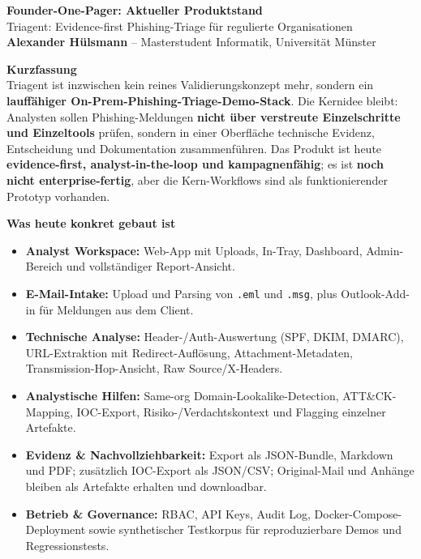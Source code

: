 \documentclass[10pt,a4paper]{article}
\begin{document}
\begin{center}
{\Large \textbf{Founder-One-Pager: Aktueller Produktstand}}\\[0.15em]
{\large Triagent: Evidence-first Phishing-Triage für regulierte Organisationen}\\[0.35em]
\textbf{Alexander Hülsmann} -- Masterstudent Informatik, Universität Münster
\end{center}
\small

\vspace{0.25em}
\noindent\textbf{Kurzfassung}\\
Triagent ist inzwischen kein reines Validierungskonzept mehr, sondern ein \textbf{lauffähiger On-Prem-Phishing-Triage-Demo-Stack}. Die Kernidee bleibt: Analysten sollen Phishing-Meldungen \textbf{nicht über verstreute Einzelschritte und Einzeltools} prüfen, sondern in einer Oberfläche technische Evidenz, Entscheidung und Dokumentation zusammenführen. Das Produkt ist heute \textbf{evidence-first, analyst-in-the-loop und kampagnenfähig}; es ist \textbf{noch nicht enterprise-fertig}, aber die Kern-Workflows sind als funktionierender Prototyp vorhanden.

\vspace{0.3em}
\noindent\textbf{Was heute konkret gebaut ist}
\begin{itemize}
  \item \textbf{Analyst Workspace:} Web-App mit Uploads, In-Tray, Dashboard, Admin-Bereich und vollständiger Report-Ansicht.
  \item \textbf{E-Mail-Intake:} Upload und Parsing von \texttt{.eml} und \texttt{.msg}, plus Outlook-Add-in für Meldungen aus dem Client.
  \item \textbf{Technische Analyse:} Header-/Auth-Auswertung (SPF, DKIM, DMARC), URL-Extraktion mit Redirect-Auflösung, Attachment-Metadaten, Transmission-Hop-Ansicht, Raw Source/X-Headers.
  \item \textbf{Analystische Hilfen:} Same-org Domain-Lookalike-Detection, ATT\&CK-Mapping, IOC-Export, Risiko-/Verdachtskontext und Flagging einzelner Artefakte.
  \item \textbf{Evidenz \& Nachvollziehbarkeit:} Export als JSON-Bundle, Markdown und PDF; zusätzlich IOC-Export als JSON/CSV; Original-Mail und Anhänge bleiben als Artefakte erhalten und downloadbar.
  \item \textbf{Betrieb \& Governance:} RBAC, API Keys, Audit Log, Docker-Compose-Deployment sowie synthetischer Testkorpus für reproduzierbare Demos und Regressionstests.
\end{itemize}
\end{document}
